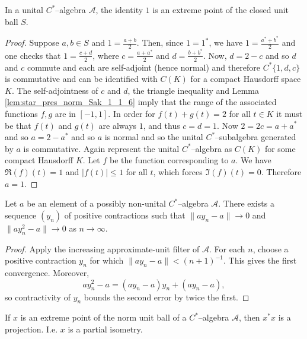 \begin{lemma}
  \label{lem:one_is_extreme}
  \leanok
  In a unital $C^{*}$--algebra $\mathcal{A}$, the identity $1$ is an extreme point of the closed unit ball $S$.
\end{lemma}

\begin{proof}
  \leanok
  Suppose $a,b\in S$ and $1=\frac{a+b}{2}$. Then, since $1=1^{*}$, we have $1=\frac{a^{*}+b^{*}}{2}$ and one checks that $1=\frac{c+d}{2}$,
  where $c=\frac{a+a^{*}}{2}$ and $d=\frac{b+b^{*}}{2}$. Now, $d=2-c$ and so $d$ and $c$ commute and each are self-adjoint (hence normal)
  and therefore $C^{*}\{1,d,c\}$ is commutative and can be identified with $C(K)$ for a compact Hausdorff space $K$.
  The self-adjointness of $c$ and $d$, the triangle inequality and Lemma \ref{lem:star_pres_norm_Sak_1_1_6} imply
  that the range of the associated functions $f,g$ are in $[-1,1]$. In order for $f(t)+g(t)=2$ for all $t\in K$
  it must be that $f(t)$ and $g(t)$ are always $1$, and thus $c=d=1$. Now $2=2c=a+a^{*}$ and so $a=2-a^{*}$ and so $a$ is normal and
  so the unital $C^{*}$--subalgebra generated by $a$ is commutative.
  Again represent the unital $C^{*}$--algebra as $C(K)$ for some compact Hausdorff $K$. Let $f$ be the
  function corresponding to $a$. We have $\Re(f)(t)=1$ and $|f(t)|\le 1$ for all $t$, which
  forces $\Im(f)(t)=0$. Therefore $a=1$.
\end{proof}

\begin{lemma}
  \label{lem:fake_approx_unit}
  \leanok
  Let $a$ be an element of a possibly non-unital $C^{*}$--algebra $\mathcal A$. There exists a
  sequence $(y_n)$ of positive contractions such that $\|ay_n-a\|\to 0$ and
  $\|ay_n^{2}-a\|\to 0$ as $n\to\infty$.
\end{lemma}

\begin{proof}
  \leanok
  Apply the increasing approximate-unit filter of $\mathcal A$. For each $n$,
  choose a positive contraction $y_n$ for which
  $\|ay_n-a\|<(n+1)^{-1}$. This gives the first convergence. Moreover,
  \[
    ay_n^2-a=(ay_n-a)y_n+(ay_n-a),
  \]
  so contractivity of $y_n$ bounds the second error by twice the first.
\end{proof}

\begin{lemma}
  \label{lem:extreme_partial_isom}
  \leanok
  If $x$ is an extreme point of the norm unit ball of a $C^{*}$--algebra $\mathcal{A}$, then $x^{*}x$ is a projection. I.e. $x$ is a partial
  isometry.
\end{lemma}

